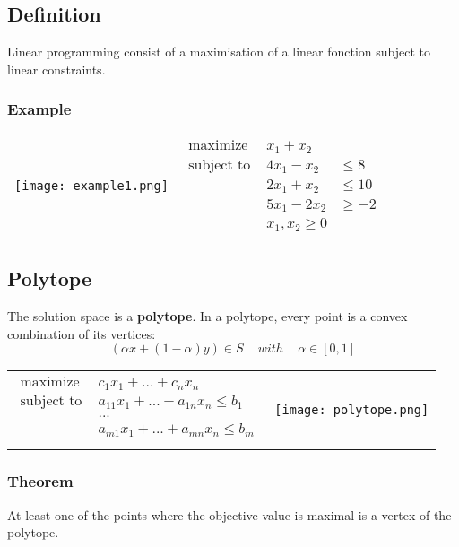 \subsection{Definition}

Linear programming consist of a maximisation of a linear fonction subject to linear constraints.

\subsubsection{Example}

\begin{tabular}{m{8cm}m{5cm}}
    \texttt{[image: example1.png]}
    &
    \begin{eqnarray*}
        \textrm{maximize } & x_1 + x_2 \\
        \textrm{subject to } & 4x_1 - x_2 & \leq 8 \\
                             & 2x_1 + x_2 & \leq 10 \\
                             & 5x_1 - 2x_2 & \geq -2\\
                            & x_1, x_2 \geq 0
        \end{eqnarray*}
\end{tabular}

\subsection{Polytope}

The solution space is a \textbf{polytope}. In a polytope, every point is a convex
combination of its vertices:
$$(\alpha x + (1 - \alpha)y) \in S \, \quad  with \quad \, \alpha \in
[0,1]$$

\begin{tabular}{m{8cm}m{4cm}}
    \begin{eqnarray*}
        \textrm{maximize } & c_1x_1 + ... + c_nx_n \\
        \textrm{subject to } & a_{11}x_1 + ... + a_{1n}x_n \leq b_1 \\
                             & ... \\
                             & a_{m1}x_1 + ... + a_{mn}x_n \leq b_m \\
        \end{eqnarray*}
        &
\texttt{[image: polytope.png]}
\end{tabular}


\subsubsection{Theorem}
At least one of the points where the objective value is maximal is a vertex of the polytope.
